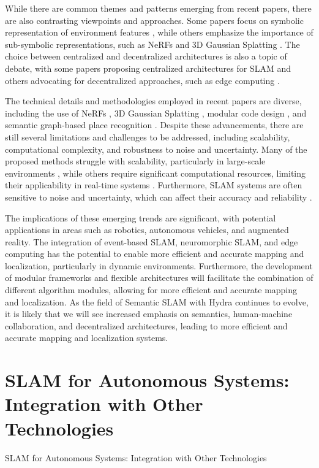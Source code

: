 \documentclass[conference]{IEEEtran}
\begin{document}
While there are common themes and patterns emerging from recent papers, there are also contrasting viewpoints and approaches. Some papers focus on symbolic representation of environment features \cite{b1}, while others emphasize the importance of sub-symbolic representations, such as NeRFs and 3D Gaussian Splatting \cite{b2}. The choice between centralized and decentralized architectures is also a topic of debate, with some papers proposing centralized architectures for SLAM \cite{b4} and others advocating for decentralized approaches, such as edge computing \cite{b1}.

The technical details and methodologies employed in recent papers are diverse, including the use of NeRFs \cite{b2}, 3D Gaussian Splatting \cite{b2}, modular code design \cite{b3}, and semantic graph-based place recognition \cite{b4}. Despite these advancements, there are still several limitations and challenges to be addressed, including scalability, computational complexity, and robustness to noise and uncertainty. Many of the proposed methods struggle with scalability, particularly in large-scale environments \cite{b5}, while others require significant computational resources, limiting their applicability in real-time systems \cite{b2}. Furthermore, SLAM systems are often sensitive to noise and uncertainty, which can affect their accuracy and reliability \cite{b4}.

The implications of these emerging trends are significant, with potential applications in areas such as robotics, autonomous vehicles, and augmented reality. The integration of event-based SLAM, neuromorphic SLAM, and edge computing has the potential to enable more efficient and accurate mapping and localization, particularly in dynamic environments. Furthermore, the development of modular frameworks and flexible architectures will facilitate the combination of different algorithm modules, allowing for more efficient and accurate mapping and localization. As the field of Semantic SLAM with Hydra continues to evolve, it is likely that we will see increased emphasis on semantics, human-machine collaboration, and decentralized architectures, leading to more efficient and accurate mapping and localization systems.

\section{SLAM for Autonomous Systems: Integration with Other Technologies}
SLAM for Autonomous Systems: Integration with Other Technologies
\end{document}
